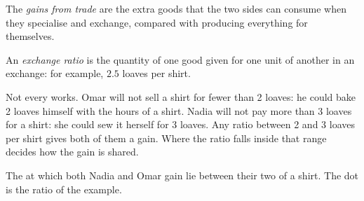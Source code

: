 \begin{definition}\label{def:g7:comparative-advantage:gains-from-trade}
The \emph{gains from trade} are the extra goods that the two
sides can consume when they specialise and exchange, compared with producing everything
for themselves.
\end{definition}

\begin{definition}\label{def:g7:comparative-advantage:exchange-ratio}
An \emph{exchange ratio} is the quantity of one good given for one
unit of another in an exchange: for example, $2.5$ loaves per shirt.
\end{definition}

Not every  works. Omar will not sell a shirt for fewer than 2 loaves: he
could bake 2 loaves himself with the hours of a shirt. Nadia will not pay more than 3
loaves for a shirt: she could sew it herself for 3 loaves. Any ratio between 2 and 3
loaves per shirt gives both of them a gain. Where the ratio falls inside that range
decides how the gain is shared.

\begin{omfigure}

{\small The  at which both Nadia and Omar gain lie between their two
 of a shirt. The dot is the ratio of the example.}
\end{omfigure}

